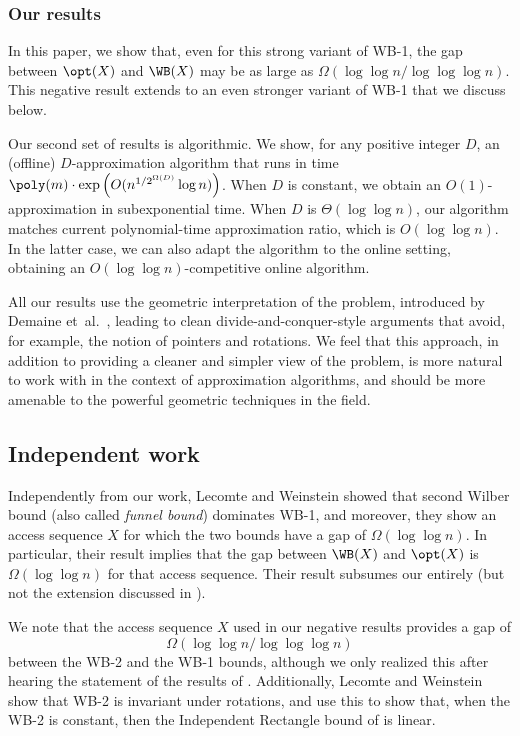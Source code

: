 \documentclass{toc}
\begin{document}
\subsubsection{Our results} 


In this paper, we show that, even for this strong variant of WB-1, the gap between $\opt(X)$ and $\WB(X)$ may be as large as $\Omega(\log \log n/ \log \log \log n)$.  This negative result extends to an even stronger variant of WB-1 that we discuss below.
%
%


Our second set of results is algorithmic.
We show, for any positive integer $D$, an (offline) $D$-approximation algorithm that runs in time $\poly(m)\cdot \exp\left(O(n^{1/2^{\Omega(D)}}\log n)\right )$. 
When $D$ is constant, we obtain an $O(1)$-approximation in subexponential time. When $D$ is $\Theta(\log \log n)$, our algorithm matches current polynomial-time approximation ratio, which is $O(\log\log n)$. In the latter case, we can also adapt the algorithm to the online setting, obtaining an $O(\log\log n)$-competitive online algorithm.

All our results use the geometric interpretation of the problem, introduced by Demaine et~al.~\cite{DHIKP09}, leading to clean divide-and-conquer-style arguments that avoid, for example, the notion of pointers and rotations.
We feel that this approach, in addition to providing a cleaner and simpler view of the problem, is more natural to work with in the context of approximation algorithms, and should be more amenable to the powerful geometric techniques in the field. 
%
%




\subsection{Independent work}
Independently from our work, Lecomte and Weinstein \cite{LW19} showed that second Wilber bound (also called \emph{funnel bound}) dominates WB-1, and moreover, they show an access sequence $X$ for which the two bounds have a gap of $\Omega(\log\log n)$. 
In particular, their result implies that the gap between $\WB(X)$ and $\opt(X)$ is $\Omega(\log\log n)$ for that access sequence. Their result subsumes our  entirely (but not the extension discussed in ).    


We note that the access sequence $X$  used in our negative results  provides a gap of
%
\[
\Omega(\log\log n/\log\log\log n)
\]
 between the WB-2 and the WB-1 bounds, although we only realized this after hearing the statement of the results of \cite{LW19}. Additionally, Lecomte and Weinstein show that WB-2 is invariant under rotations, and use this to show that, when the WB-2 is constant, then the Independent Rectangle bound of \cite{DHIKP09} is linear.
\end{document}

